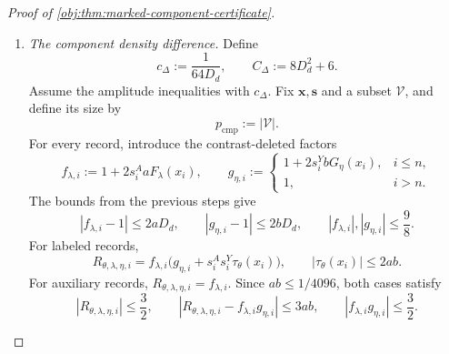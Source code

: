 \documentclass[11pt]{article}
\begin{document}
\begin{proof}[Proof of \cref{obj:thm:marked-component-certificate}]
\begin{enumerate}
The sign flip
\[
\mathcal F_\eta(\lambda,\eta):=(\lambda,-\eta)
\]
is a bijection, and its weights satisfy
\[
w_{+1}(\lambda,\eta)=w_{-1}(\lambda,-\eta).
\]
Every auxiliary likelihood is unchanged by this flip, because it depends on \(\lambda\) alone. Reindexing the finite sum consequently gives
\[
g_{+1,\mathcal V}(\mathbf x,\mathbf s)
=
g_{-1,\mathcal V}(\mathbf x,\mathbf s)
\qquad
\text{if }\mathcal V\subseteq\{n+1,\ldots,N\}.
\]
If \(\mathcal V=\{i\}\) with \(i\le n\), singleton cancellation instead gives
\[
g_{+1,\{i\}}(\mathbf x,\mathbf s)
=
g_{-1,\{i\}}(\mathbf x,\mathbf s)=1.
\]
Thus we may take
\[
c_U:=c_S.
\]
Under its amplitude conditions, every auxiliary-only component and every singleton labeled component has equal densities under the two hypotheses. Equality for all spin assignments gives equality of their full conditional laws.

\item \textit{The component density difference.}
Define
\[
c_\Delta:=\frac1{64D_d},
\qquad
C_\Delta:=8D_d^2+6.
\]
Assume the amplitude inequalities with \(c_\Delta\). Fix \(\mathbf x,\mathbf s\) and a subset \(\mathcal V\), and define its size by
\[
p_{\mathrm{cmp}}:=|\mathcal V|.
\]
For every record, introduce the contrast-deleted factors
\[
f_{\lambda,i}:=1+2s_i^AaF_\lambda(x_i),
\qquad
g_{\eta,i}:=
\begin{cases}
1+2s_i^YbG_\eta(x_i),&i\le n,\\
1,&i>n.
\end{cases}
\]
The bounds from the previous steps give
\[
|f_{\lambda,i}-1|\le2aD_d,\qquad
|g_{\eta,i}-1|\le2bD_d,
\qquad
|f_{\lambda,i}|,|g_{\eta,i}|\le\frac98.
\]
For labeled records,
\[
R_{\theta,\lambda,\eta,i}
=f_{\lambda,i}
\bigl(g_{\eta,i}+s_i^As_i^Y\tau_\theta(x_i)\bigr),
\qquad
|\tau_\theta(x_i)|\le2ab.
\]
For auxiliary records, \(R_{\theta,\lambda,\eta,i}=f_{\lambda,i}\). Since \(ab\le1/4096\), both cases satisfy
\[
|R_{\theta,\lambda,\eta,i}|
\le\frac32,
\qquad
|R_{\theta,\lambda,\eta,i}-f_{\lambda,i}g_{\eta,i}|
\le3ab,
\qquad
|f_{\lambda,i}g_{\eta,i}|\le\frac32.
\]


\end{enumerate}
\end{proof}
\end{document}
